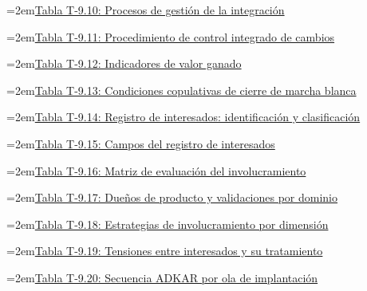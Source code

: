 \documentclass[11pt]{article}
\begin{document}
\noindent\hangindent=2em\hyperref[tab:t9-integracion]{Tabla T-9.10: Procesos de gestión de la integración}\dotfill\pageref{tab:t9-integracion}\par\vspace{0.4\baselineskip}
\noindent\hangindent=2em\hyperref[tab:t9-cambios]{Tabla T-9.11: Procedimiento de control integrado de cambios}\dotfill\pageref{tab:t9-cambios}\par\vspace{0.4\baselineskip}
\noindent\hangindent=2em\hyperref[tab:t9-evm]{Tabla T-9.12: Indicadores de valor ganado}\dotfill\pageref{tab:t9-evm}\par\vspace{0.4\baselineskip}
\noindent\hangindent=2em\hyperref[tab:t9-cierre]{Tabla T-9.13: Condiciones copulativas de cierre de marcha blanca}\dotfill\pageref{tab:t9-cierre}\par\vspace{0.4\baselineskip}
\noindent\hangindent=2em\hyperref[tab:t9-registro]{Tabla T-9.14: Registro de interesados: identificación y clasificación}\dotfill\pageref{tab:t9-registro}\par\vspace{0.4\baselineskip}
\noindent\hangindent=2em\hyperref[tab:t9-campos]{Tabla T-9.15: Campos del registro de interesados}\dotfill\pageref{tab:t9-campos}\par\vspace{0.4\baselineskip}
\noindent\hangindent=2em\hyperref[tab:t9-involucramiento]{Tabla T-9.16: Matriz de evaluación del involucramiento}\dotfill\pageref{tab:t9-involucramiento}\par\vspace{0.4\baselineskip}
\noindent\hangindent=2em\hyperref[tab:t9-po]{Tabla T-9.17: Dueños de producto y validaciones por dominio}\dotfill\pageref{tab:t9-po}\par\vspace{0.4\baselineskip}
\noindent\hangindent=2em\hyperref[tab:t9-dimensiones]{Tabla T-9.18: Estrategias de involucramiento por dimensión}\dotfill\pageref{tab:t9-dimensiones}\par\vspace{0.4\baselineskip}
\noindent\hangindent=2em\hyperref[tab:t9-tensiones]{Tabla T-9.19: Tensiones entre interesados y su tratamiento}\dotfill\pageref{tab:t9-tensiones}\par\vspace{0.4\baselineskip}
\noindent\hangindent=2em\hyperref[tab:t9-adkar]{Tabla T-9.20: Secuencia ADKAR por ola de implantación}\dotfill\pageref{tab:t9-adkar}\par\vspace{0.4\baselineskip}
\end{document}
